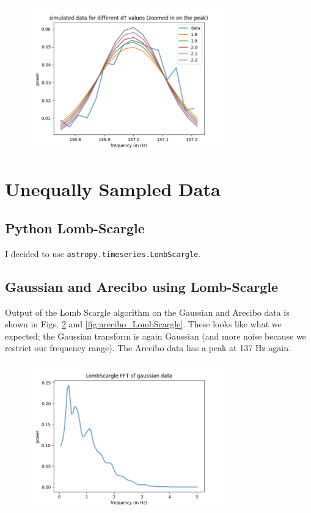 \documentclass{article}
\begin{document}
\begin{figure}[h!]
\centering
\includegraphics[width=0.75\textwidth]{plots/arecibo_dTs2.png}
\caption{\label{fig:arecibo_dTs2}  }
\end{figure}


\section{Unequally Sampled Data}

\subsection{Python Lomb-Scargle}

I decided to use \texttt{astropy.timeseries.LombScargle}.

\subsection{Gaussian and Arecibo using Lomb-Scargle}

Output of the Lomb Scargle algorithm on the Gaussian and Arecibo data is shown in Figs. \ref{fig:gauss_LombScargle} and \ref{fig:arecibo_LombScargle}. These looks like what we expected; the Gaussian transform is again Gaussian (and more noise because we restrict our frequency range). The Arecibo data has a peak at 137 Hz again.

\begin{figure}[h!]
\centering
\includegraphics[width=0.75\textwidth]{plots/gauss_LombScargle.png}
\caption{\label{fig:gauss_LombScargle}  }
\end{figure}
\end{document}
